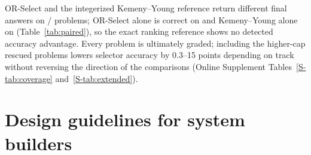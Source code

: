 \documentclass[preprint,11pt,number,sort&compress]{elsarticle}
\begin{document}
OR-Select and the integerized Kemeny--Young reference return different final answers on
\KYTopOneDiffers/\KYTopOneN{} problems; OR-Select alone is correct on \KYORwins{} and Kemeny--Young alone on
\KYKYwins{} (Table~\ref{tab:paired}), so the exact ranking reference shows no detected accuracy advantage.
Every problem is ultimately graded; including the higher-cap rescued problems lowers selector accuracy by
0.3--15 points depending on track without reversing the direction of the comparisons
(Online Supplement Tables~\ref{S-tab:coverage} and~\ref{S-tab:extended}).

\section{Design guidelines for system builders}
\label{sec:guidelines}
\end{document}
